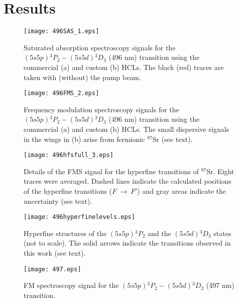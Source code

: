\documentclass[twocolumn,10pt,a4paper]{article}
\begin{document}
\section{Results}

\begin{figure}[t]
	\begin{center}
		\texttt{[image: 496SAS\_1.eps]}
		\caption{Saturated absorption spectroscopy signals for the $(5s5p){}^3P_2-(5s5d){}^3D_3$ (496 nm) transition using the commercial (a) and custom (b) HCLs. The black (red) traces are taken with (without) the pump beam.}
		\label{fig:496_1}
	\end{center}
\end{figure}

\begin{figure}[t]
	\begin{center}
		\texttt{[image: 496FMS\_2.eps]}
		\caption{Frequency modulation spectroscopy signals for the $(5s5p){}^3P_2-(5s5d){}^3D_3$ (496 nm) transition using the commercial (a) and custom (b) HCLs. The small dispersive signals in the wings in (b) arise from fermionic ${}^{87}\mathrm{Sr}$ (see text).}
		\label{fig:496_3}
	\end{center}
\end{figure}

\begin{figure}[t]
	\begin{center}
		\texttt{[image: 496hfsfull\_3.eps]}
		\caption{Details of the FMS signal for the hyperfine transitions of ${}^{87}\mathrm{Sr}$. Eight traces were averaged. Dashed lines indicate the calculated positions of the hyperfine transitions ($F\ \rightarrow\ F'$) and gray areas indicate the uncertainty (see text).}
		\label{fig:496_2}
	\end{center}
\end{figure}

\begin{figure}[t]
	\begin{center}
		\texttt{[image: 496hyperfinelevels.eps]}
		\caption{Hyperfine structures of the $(5s5p){}^3P_2$ and the $(5s5d){}^3D_3$ states (not to scale). The solid arrows indicate the transitions observed in this work (see text).}
		\label{fig:hyperfinelevels}
	\end{center}
\end{figure}

\begin{figure}[t]
	\begin{center}
		\texttt{[image: 497.eps]}
		\caption{FM spectroscopy signal for the $(5s5p){}^3P_2-(5s5d){}^3D_2$ (497 nm) transition.}
		\label{fig:497}
	\end{center}
\end{figure}
\end{document}
